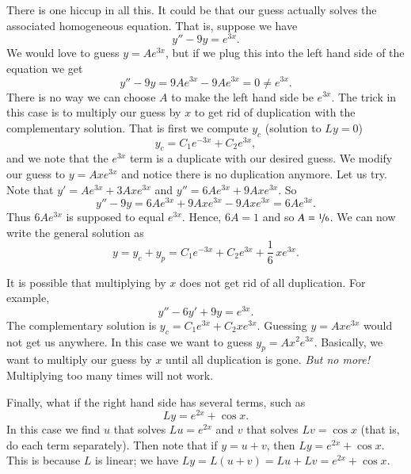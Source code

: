 \documentclass[12pt]{book}
\begin{document}
\medskip

There is one hiccup in all this.  It could be that our guess actually
solves the associated homogeneous equation.  That is, suppose we have
\begin{equation*}
y'' - 9y = e^{3x} .
\end{equation*}
We would love to guess $y = Ae^{3x}$, but if we plug this into the left
hand side of the equation we get
\begin{equation*}
y''-9y = 9Ae^{3x} - 9Ae^{3x} = 0 \not= e^{3x} .
\end{equation*}
There is no way we can choose $A$ to make the left hand side be $e^{3x}$.
The trick in
this case
is to multiply our guess by $x$ to get rid of duplication with the
complementary solution.  That is first we compute $y_c$ (solution to $Ly =
0$)
\begin{equation*}
y_c = C_1 e^{-3x} + C_2 e^{3x} ,
\end{equation*}
and we note that the $e^{3x}$ term is a duplicate with our desired guess.
We modify our guess to $y = Axe^{3x}$ and notice there is no
duplication anymore.  Let us try.  Note that
$y' = Ae^{3x} + 3Axe^{3x}$ and 
$y'' = 6Ae^{3x} + 9Axe^{3x}$.  So
\begin{equation*}
y'' -9y = 6Ae^{3x} + 9Axe^{3x} - 9Axe^{3x} = 
6Ae^{3x} .
\end{equation*}
Thus $6Ae^{3x}$ is supposed to equal $e^{3x}$.  Hence,
$6A = 1$ and so $A=\nicefrac{1}{6}$.  We can now write the general
solution as
\begin{equation*}
y = y_c + y_p = 
C_1 e^{-3x} + C_2 e^{3x} + \frac{1}{6}\,xe^{3x} .
\end{equation*}

\medskip

It is possible that
multiplying by $x$ does not get rid of all
duplication.  For example,
\begin{equation*}
y''-6y'+9y = e^{3x} .
\end{equation*}
The complementary solution is
$y_c = C_1 e^{3x} + C_2 x e^{3x}$.  Guessing $y=A xe^{3x}$
would not get us anywhere.  In this case we want to guess
$y_p = Ax^2e^{3x}$. Basically, we want to multiply our guess by $x$
until all duplication is gone.  \emph{But no more!}  Multiplying too many
times will not work.

\medskip

Finally, what if the right hand side has several terms, such as
\begin{equation*}
Ly = e^{2x} + \cos x .
\end{equation*}
In this case we find $u$ that solves $Lu = e^{2x}$ and $v$ that
solves $Lv = \cos x$ (that is, do each term separately).  Then note
that if $y = u+ v$, then $Ly = e^{2x} + \cos x$.  This is because
$L$ is linear; we have
$Ly = L(u+v) = Lu + Lv = e^{2x} + \cos x$.
\end{document}
